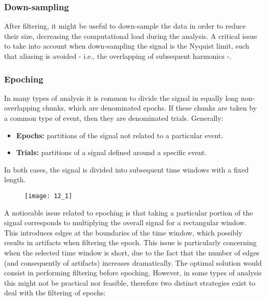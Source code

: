\subsubsection{Down-sampling}
After filtering, it might be useful to down-sample the data in order to reduce their size, decreasing
the computational load during the analysis. A critical issue to
take into account when down-sampling the signal is the Nyquist limit, such that
aliasing is avoided - i.e., the overlapping of subsequent harmonics -.
\subsubsection{Epoching}
In many types of analysis it is common to divide the signal in equally long
non-overlapping chunks, which are denominated epochs. If these chunks are taken
by a common type of event, then they are denominated trials. Generally:
\begin{itemize}
    \item \textbf{Epochs:} partitions of the signal not related to a particular event.
    \item \textbf{Trials:} partitions of a signal defined around a specific event.
\end{itemize}
In both cases, the signal is divided into subsequent time windows with a fixed
length.
\begin{figure}[H]
    \centering
    \texttt{[image: 12\_1]}
\end{figure}
A noticeable issue related to epoching is that taking a particular portion of
the signal corresponds to multiplying the overall signal for a rectangular window.
This introduces edges at the boundaries of the time window, which possibly results
in artifacts when filtering the epoch. This issue is particularly concerning when
the selected time window is short, due to the fact that the number of edges
(and consequently of artifacts) increases dramatically.
The optimal solution would consist in performing filtering before epoching. However,
in some types of analysis this might not be practical nor feasible, therefore two
distinct strategies exist to deal with the filtering of epochs:
